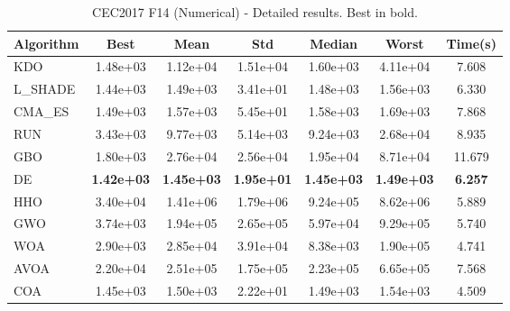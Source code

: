\begin{table}[H]
\centering\small
\caption{CEC2017 F14 (Numerical) - Detailed results. Best in bold.}
\label{tab:cec2017_F14}
\begin{tabular}{lcccccc}
\toprule
\textbf{Algorithm} & \textbf{Best} & \textbf{Mean} & \textbf{Std} & \textbf{Median} & \textbf{Worst} & \textbf{Time(s)} \\
\midrule
KDO & 1.48e+03 & 1.12e+04 & 1.51e+04 & 1.60e+03 & 4.11e+04 & 7.608 \\
L_SHADE & 1.44e+03 & 1.49e+03 & 3.41e+01 & 1.48e+03 & 1.56e+03 & 6.330 \\
CMA_ES & 1.49e+03 & 1.57e+03 & 5.45e+01 & 1.58e+03 & 1.69e+03 & 7.868 \\
RUN & 3.43e+03 & 9.77e+03 & 5.14e+03 & 9.24e+03 & 2.68e+04 & 8.935 \\
GBO & 1.80e+03 & 2.76e+04 & 2.56e+04 & 1.95e+04 & 8.71e+04 & 11.679 \\
DE & \textbf{1.42e+03} & \textbf{1.45e+03} & \textbf{1.95e+01} & \textbf{1.45e+03} & \textbf{1.49e+03} & \textbf{6.257} \\
HHO & 3.40e+04 & 1.41e+06 & 1.79e+06 & 9.24e+05 & 8.62e+06 & 5.889 \\
GWO & 3.74e+03 & 1.94e+05 & 2.65e+05 & 5.97e+04 & 9.29e+05 & 5.740 \\
WOA & 2.90e+03 & 2.85e+04 & 3.91e+04 & 8.38e+03 & 1.90e+05 & 4.741 \\
AVOA & 2.20e+04 & 2.51e+05 & 1.75e+05 & 2.23e+05 & 6.65e+05 & 7.568 \\
COA & 1.45e+03 & 1.50e+03 & 2.22e+01 & 1.49e+03 & 1.54e+03 & 4.509 \\
\bottomrule
\end{tabular}
\end{table}
